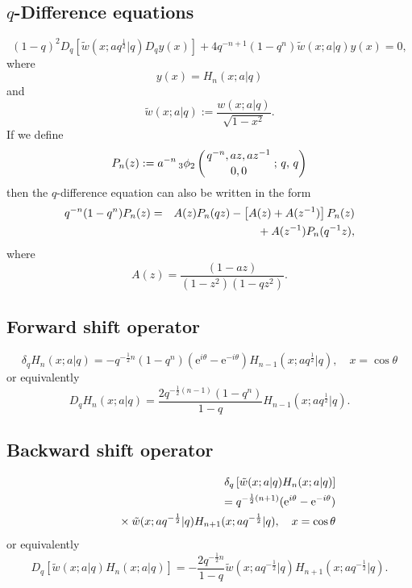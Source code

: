 \documentclass[envcountchap,graybox]{svmono}
\newcommand{\qhyp}[5]{\mbox{}_{#1}{\phi}_{#2}
\left(\genfrac{}{}{0pt}{}{#3}{#4}\,;\,q,\,#5\right)}
\newcommand{\mathindent}{\hspace{7.5mm}}
\newcommand{\e}{\textrm{e}}
\newcommand{\qhyp}[5]{\,\mbox{}_{#1}\phi_{#2}\!\left(
  \genfrac{}{}{0pt}{}{#3}{#4};#5\right)}
\begin{document}
{{\subsection*{$q$-Difference equations}
\begin{equation}
\label{dvContBigqHermite1}
(1-q)^2D_q\left[{\tilde w}(x;aq^{\frac{1}{2}}|q)D_qy(x)\right]
+4q^{-n+1}(1-q^n){\tilde w}(x;a|q)y(x)=0,
\end{equation}
where
$$y(x)=H_n(x;a|q)$$
and
$${\tilde w}(x;a|q):=\frac{w(x;a|q)}{\sqrt{1-x^2}}.$$
If we define
$$P_n(z):=a^{-n}\,\qhyp{3}{2}{q^{-n},az,az^{-1}}{0,0}{q}$$
then the $q$-difference equation can also be written in the form
\begin{eqnarray}
\label{dvContBigqHermite2}
q^{-n}(1-q^n)P_n(z)&=&A(z)P_n(qz)-\left[A(z)+A(z^{-1})\right]P_n(z)\nonumber\\
& &{}\mathindent{}+A(z^{-1})P_n(q^{-1}z),
\end{eqnarray}
where
$$A(z)=\frac{(1-az)}{(1-z^2)(1-qz^2)}.$$

\subsection*{Forward shift operator}
\begin{equation}
\label{shift1ContBigqHermiteI}
\delta_qH_n(x;a|q)=-q^{-\frac{1}{2}n}(1-q^n)(\e^{i\theta}-\e^{-i\theta})
H_{n-1}(x;aq^{\frac{1}{2}}|q),\quad x=\cos\theta
\end{equation}
or equivalently
\begin{equation}
\label{shift1ContBigqHermiteII}
D_qH_n(x;a|q)=\frac{2q^{-\frac{1}{2}(n-1)}(1-q^n)}{1-q}
H_{n-1}(x;aq^{\frac{1}{2}}|q).
\end{equation}

\subsection*{Backward shift operator}
\begin{eqnarray}
\label{shift2ContBigqHermiteI}
& &\delta_q\left[{\tilde w}(x;a|q)H_n(x;a|q)\right]\nonumber\\
& &{}=q^{-\frac{1}{2}(n+1)}(\e^{i\theta}-\e^{-i\theta})\nonumber\\
& &{}\mathindent{}\times
{\tilde w}(x;aq^{-\frac{1}{2}}|q)H_{n+1}(x;aq^{-\frac{1}{2}}|q),\quad x=\cos\theta
\end{eqnarray}
or equivalently
\begin{equation}
\label{shift2ContBigqHermiteII}
D_q\left[{\tilde w}(x;a|q)H_n(x;a|q)\right]=
-\frac{2q^{-\frac{1}{2}n}}{1-q}{\tilde w}(x;aq^{-\frac{1}{2}}|q)H_{n+1}(x;aq^{-\frac{1}{2}}|q).
\end{equation}

}}
\end{document}
